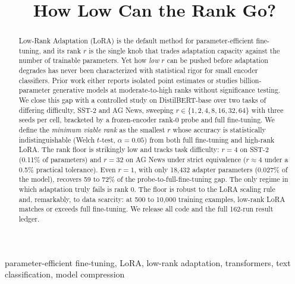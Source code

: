 \documentclass[conference]{IEEEtran}
\begin{document}
\title{How Low Can the Rank Go?}

\author{
}

\maketitle

\begin{abstract}
Low-Rank Adaptation (LoRA) is the default method for parameter-efficient fine-tuning, and its rank $r$ is the single knob that trades adaptation capacity against the number of trainable parameters. Yet how \emph{low} $r$ can be pushed before adaptation degrades has never been characterized with statistical rigor for small encoder classifiers. Prior work either reports isolated point estimates or studies billion-parameter generative models at moderate-to-high ranks without significance testing. We close this gap with a controlled study on DistilBERT-base over two tasks of differing difficulty, SST-2 and AG News, sweeping $r \in \{1,2,4,8,16,32,64\}$ with three seeds per cell, bracketed by a frozen-encoder rank-0 probe and full fine-tuning. We define the \emph{minimum viable rank} as the smallest $r$ whose accuracy is statistically indistinguishable (Welch $t$-test, $\alpha{=}0.05$) from both full fine-tuning and high-rank LoRA. The rank floor is strikingly low and tracks task difficulty: $r{=}4$ on SST-2 (0.11\% of parameters) and $r{=}32$ on AG News under strict equivalence ($r{\approx}4$ under a 0.5\% practical tolerance). Even $r{=}1$, with only 18{,}432 adapter parameters (0.027\% of the model), recovers 59 to 72\% of the probe-to-full-fine-tuning gap. The only regime in which adaptation truly fails is rank 0. The floor is robust to the LoRA scaling rule and, remarkably, to data scarcity: at 500 to 10{,}000 training examples, low-rank LoRA matches or exceeds full fine-tuning. We release all code and the full 162-run result ledger.
\end{abstract}

\begin{IEEEkeywords}
parameter-efficient fine-tuning, LoRA, low-rank adaptation, transformers, text classification, model compression
\end{IEEEkeywords}
\end{document}
